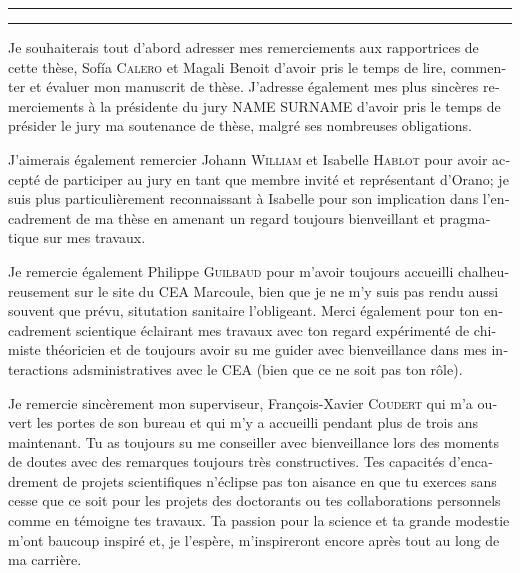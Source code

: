 \begin{otherlanguage}{french}

\hrule\relax
\vspace*{.9\baselineskip}%
\raggedright{\huge{}}\par%
\vspace*{1.1\baselineskip}%
\hrule\relax
\vspace*{\baselineskip}%
\thispagestyle{empty}

\begingroup
\itshape

Je souhaiterais tout d'abord adresser mes remerciements aux rapportrices de cette thèse, Sof{\'{i}}a \textsc{Calero} et Magali Benoit d'avoir pris le temps de lire, commenter et évaluer mon manuscrit de thèse. J'adresse également mes plus sincères remerciements à la présidente du jury NAME \textsc{SURNAME} d'avoir pris le temps de présider le jury ma soutenance de thèse, malgré ses nombreuses obligations. 

J'aimerais également remercier Johann \textsc{William} et Isabelle \textsc{Hablot} pour avoir accepté de participer au jury en tant que membre invité et représentant d'Orano; je suis plus particulièrement reconnaissant à Isabelle pour son implication dans l'encadrement de ma thèse en amenant un regard toujours bienveillant et pragmatique sur mes travaux.

Je remercie également Philippe \textsc{Guilbaud} pour m'avoir toujours accueilli chalheureusement sur le site du CEA Marcoule, bien que je ne m'y suis pas rendu aussi souvent que prévu, situtation sanitaire l'obligeant. Merci également pour ton encadrement scientique éclairant mes travaux avec ton regard expérimenté de chimiste théoricien et de toujours avoir su me guider avec bienveillance dans mes interactions adsministratives avec le CEA (bien que ce ne soit pas ton rôle).

Je remercie sincèrement mon superviseur, François-Xavier \textsc{Coudert} qui m'a ouvert les portes de son bureau et qui m'y a accueilli pendant plus de trois ans maintenant. Tu as toujours su me conseiller avec bienveillance lors des moments de doutes avec des remarques toujours très constructives. Tes capacités d'encadrement de projets scientifiques n'éclipse pas ton aisance en  que tu exerces sans cesse que ce soit pour les projets des doctorants ou tes collaborations personnels comme en témoigne tes travaux. Ta passion pour la science et ta grande modestie m'ont baucoup inspiré et, je l'espère, m'inspireront encore après tout au long de ma carrière.


\end{otherlanguage}
